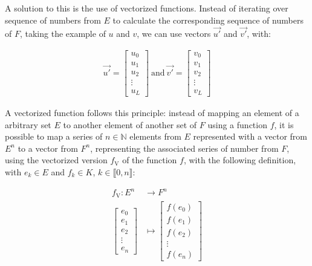 \documentclass[a4paper, 11pt]{report}
\begin{document}
    A solution to this is the use of vectorized functions. Instead of iterating over sequence of numbers from $E$ to calculate the corresponding sequence of numbers of $F$, taking the example of $u$ and $v$, we can use vectors $\overrightarrow{u'}$ and $\overrightarrow{v'}$, with:
    
    \begin{align}
        \overrightarrow{u'} = \begin{bmatrix}
            u_0 \\
            u_1 \\
            u_2 \\
            \vdots \\
            u_L
        \end{bmatrix} \ \text{and} \ \overrightarrow{v'} = \begin{bmatrix}
            v_0 \\
            v_1 \\
            v_2 \\
            \vdots \\
            v_L
        \end{bmatrix}
    \end{align}
    
    A vectorized function follows this principle: instead of mapping an element of a arbitrary set $E$ to another element of another set of $F$ using a function $f$, it is possible to map a series of $n \in \mathbb{N}$ elements from $E$ represented with a vector from $E^n$ to a vector from $F^n$, representing the associated series of number from $F$, using the vectorized version $f_\text{V}$ of the function $f$, with the following definition, with $e_k \in E$ and $f_k \in K$, $k \in \llbracket0, n\rrbracket$:
    
    \begin{align}
        f_\text{V}: E^n & \longrightarrow  F^n \\[5pt]
        \begin{bmatrix}
            e_0 \\
            e_1 \\
            e_2 \\
            \vdots \\
            e_n
        \end{bmatrix} & \longmapsto  \begin{bmatrix}
            f(e_0) \\
            f(e_1) \\
            f(e_2) \\
            \vdots \\
            f(e_n)
        \end{bmatrix}
    \end{align}
    
\end{document}
